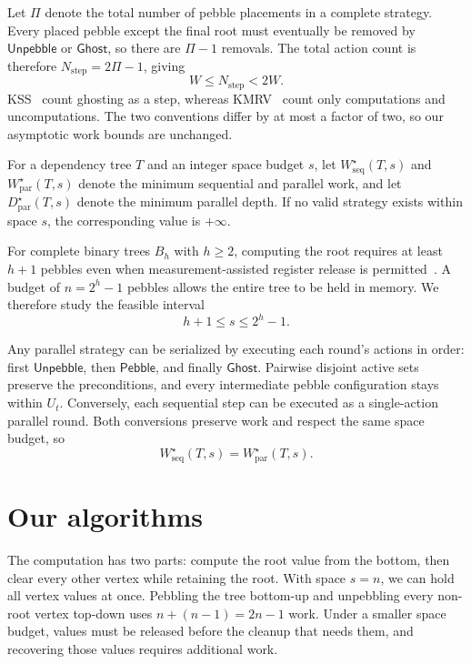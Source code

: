 \documentclass[11pt]{article}
\theoremstyle{definition}
\theoremstyle{remark}
\newcommand{\Peb}{\mathsf{Pebble}}
\newcommand{\Unp}{\mathsf{Unpebble}}
\newcommand{\Ghost}{\mathsf{Ghost}}
\newcommand{\Wseq}{W_{\mathrm{seq}}}
\newcommand{\Wpar}{W_{\mathrm{par}}}
\newcommand{\Dpar}{D_{\mathrm{par}}}
\begin{document}
Let $\Pi$ denote the total number of pebble placements in a complete strategy. Every placed pebble except the final root must eventually be removed by $\Unp$ or $\Ghost$, so there are $\Pi-1$ removals. The total action count is therefore $N_{\mathrm{step}}=2\Pi-1$, giving
\begin{equation}
W\le N_{\mathrm{step}}<2W.
\end{equation}
KSS~\cite{KSS2025} count ghosting as a step, whereas KMRV~\cite{KMRV2026} count only computations and uncomputations. The two conventions differ by at most a factor of two, so our asymptotic work bounds are unchanged.

For a dependency tree $T$ and an integer space budget $s$, let $\Wseq^\star(T,s)$ and $\Wpar^\star(T,s)$ denote the minimum sequential and parallel work, and let $\Dpar^\star(T,s)$ denote the minimum parallel depth. If no valid strategy exists within space $s$, the corresponding value is $+\infty$.

For complete binary trees $B_h$ with $h\ge2$, computing the root requires at least $h+1$ pebbles even when measurement-assisted register release is permitted~\cite{Cook1973,KSS2025}. A budget of $n=2^h-1$ pebbles allows the entire tree to be held in memory. We therefore study the feasible interval
\begin{equation}
h+1\le s\le2^h-1.
\end{equation}

Any parallel strategy can be serialized by executing each round's actions in order: first $\Unp$, then $\Peb$, and finally $\Ghost$. Pairwise disjoint active sets preserve the preconditions, and every intermediate pebble configuration stays within $U_t$. Conversely, each sequential step can be executed as a single-action parallel round. Both conversions preserve work and respect the same space budget, so
\begin{equation}
\Wseq^\star(T,s)=\Wpar^\star(T,s).
\label{eq:serialize}
\end{equation}



\section{Our algorithms}
\label{sec:main-algorithms}

The computation has two parts: compute the root value from the bottom, then clear every other vertex while retaining the root. With space $s=n$, we can hold all vertex values at once. Pebbling the tree bottom-up and unpebbling every non-root vertex top-down uses $n+(n-1)=2n-1$ work. Under a smaller space budget, values must be released before the cleanup that needs them, and recovering those values requires additional work.
\end{document}
